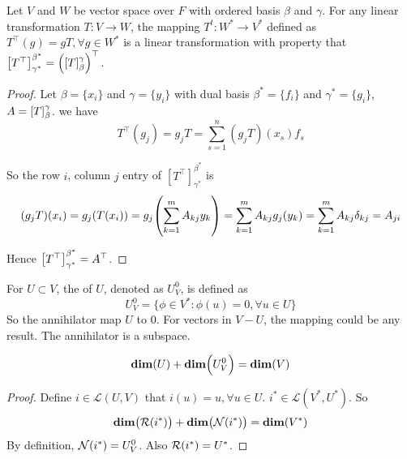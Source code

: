\begin{theorem}
	Let $V$ and $W$ be vector space over $F$ with ordered basis $\beta$ and $\gamma$. For any linear transformation $T:V \rightarrow W$, the mapping $T^t: W^* \rightarrow V^*$ defined as $T^\top (g) = gT, \forall g \in W^*$ is a linear transformation with property that $\mleft[T^\top \mright]_{\gamma^*}^{\beta^*} = \mleft(\mleft[T \mright]_\beta^\gamma \mright)^\top$.
\end{theorem}
\begin{proof}
	Let $\beta = \{x_i\}$ and $\gamma=\{y_i\}$ with dual basis $\beta^*=\{f_i\}$ and $\gamma^*=\{g_i\}$, $A=\coordinate{T}_\beta^\gamma$. we have
	\begin{equation*}
		T^\top (g_j) = g_j T = \sum_{s=1}^n (g_j T) (x_s) f_s
	\end{equation*}
	
	So the row $i$, column $j$ entry of $[T^\top]_{\gamma^*}^{\beta^*}$ is
	\begin{equation*}
	(g_j T)(x_i) = g_j (T(x_i))= g_j \mleft( \sum_{k=1}^m A_{kj} y_k \mright) = \sum_{k=1}^m A_{kj} g_j(y_k)= \sum_{k=1}^m A_{kj} \delta_{kj} = A_{ji}
	\end{equation*}
	
	Hence $\mleft[T^\top \mright]_{\gamma^*}^{\beta^*} = A^\top $.
\end{proof}

\begin{definition}
    For $U \subset V$, the  of $U$, denoted as $U^0_V$, is defined as
    \begin{equation*}
        U^0_V = \{ \phi \in V^*: \phi(u) = 0, \forall u \in U \}
    \end{equation*}
    So the annihilator map $U$ to $0$. For vectors in $V - U$, the mapping could be any result. The annihilator is a subspace.
\end{definition}

\begin{theorem}
    \begin{equation}
        \dimension{U} + \dimension{U_V^0} = \dimension{V}
    \end{equation}
\end{theorem}

\begin{proof}
    Define $i \in \mathcal{L}(U,V)$ that $i(u) = u, \forall u \in U$. $i^* \in \mathcal{L}(V^*,U^*)$. So
    \begin{equation*}
        \dimension{\rangespace{i^*} } +\dimension{\nullspace{i^*}} = \dimension{V^*}
    \end{equation*}
    By definition, $\mathcal{N}(i^*) = U^0_V$. Also $\mathcal{R}(i^*) = U^*$.
\end{proof}


